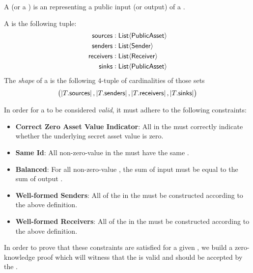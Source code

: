 \begin{definition}
    A \Source{} (or a \Sink{}) is an \PublicAsset{} representing a public input (or output) of a \Transfer{}.
\end{definition}

\begin{definition}
    A \Transfer{} is the following tuple:
    \begin{align*}
        {\textsf{sources}}    &: {\textsf{List}}\langle{{\textsf{PublicAsset}}}\rangle \\
        {\textsf{senders}}    &: {\textsf{List}}\langle{{\textsf{Sender}}}\rangle \\
        {\textsf{receivers}}  &: {\textsf{List}}\langle{{\textsf{Receiver}}}\rangle \\
        {\textsf{sinks}}      &: {\textsf{List}}\langle{{\textsf{PublicAsset}}}\rangle
    \end{align*}
    The \emph{shape} of a \Transfer{} is the following $4$-tuple of cardinalities of those sets
    \[\left(\left|T.{\textsf{sources}}\right|, \left|T.{\textsf{senders}}\right|, \left|T.{\textsf{receivers}}\right|, \left|T.{\textsf{sinks}}\right|\right)\]
\end{definition}

In order for a \Transfer{} to be considered \emph{valid}, it must adhere to the following constraints:

\begin{itemize}
    \item \textbf{Correct Zero Asset Value Indicator}: All  in the \Transfer{} must correctly indicate whether the underlying secret asset value is zero.
    \item \textbf{Same Id}: All non-zero-value  in the \Transfer{} must have the same \AssetId{}.
    \item \textbf{Balanced}: For all non-zero-value , the sum of input  must be equal to the sum of output .
    \item \textbf{Well-formed Senders}: All of the  in the \Transfer{} must be constructed according to the above \Sender{} definition.
    \item \textbf{Well-formed Receivers}: All of the  in the \Transfer{} must be constructed according to the above \Receiver{} definition.
\end{itemize}

In order to prove that these constraints are satisfied for a given \Transfer{}, we build a zero-knowledge proof which will witness that the \Transfer{} is valid and should be accepted by the \Ledger{}. 

